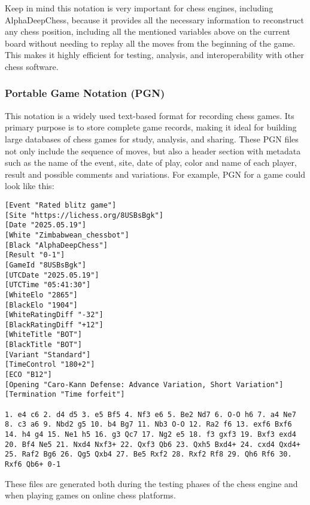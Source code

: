 \noindent Keep in mind this notation is very important for chess engines, including AlphaDeepChess, because it provides all the necessary information to reconstruct any chess position, including all the mentioned variables above on the current board without needing to replay all the moves from the beginning of the game. This makes it highly efficient for testing, analysis, and interoperability with other chess software.

\subsubsection{Portable Game Notation (PGN)}

This notation is a widely used text-based format for recording chess games. Its primary purpose is to store complete game records, making it ideal for building large databases of chess games for study, analysis, and sharing. These PGN files not only include the sequence of moves, but also a header section with metadata such as the name of the event, site, date of play, color and name of each player, result and possible comments and variations. For example, PGN for a game could look like this:

\vspace{1em}

\begin{lstlisting}[basicstyle=\ttfamily\small, captionpos=b, breaklines=true, frame=single, caption={Example of a PGN file}, label={lst:pgn-example}]
[Event "Rated blitz game"]
[Site "https://lichess.org/8USBsBgk"]
[Date "2025.05.19"]
[White "Zimbabwean_chessbot"]
[Black "AlphaDeepChess"]
[Result "0-1"]
[GameId "8USBsBgk"]
[UTCDate "2025.05.19"]
[UTCTime "05:41:30"]
[WhiteElo "2865"]
[BlackElo "1904"]
[WhiteRatingDiff "-32"]
[BlackRatingDiff "+12"]
[WhiteTitle "BOT"]
[BlackTitle "BOT"]
[Variant "Standard"]
[TimeControl "180+2"]
[ECO "B12"]
[Opening "Caro-Kann Defense: Advance Variation, Short Variation"]
[Termination "Time forfeit"]

1. e4 c6 2. d4 d5 3. e5 Bf5 4. Nf3 e6 5. Be2 Nd7 6. O-O h6 7. a4 Ne7 8. c3 a6 9. Nbd2 g5 10. b4 Bg7 11. Nb3 O-O 12. Ra2 f6 13. exf6 Bxf6 14. h4 g4 15. Ne1 h5 16. g3 Qc7 17. Ng2 e5 18. f3 gxf3 19. Bxf3 exd4 20. Bf4 Ne5 21. Nxd4 Nxf3+ 22. Qxf3 Qb6 23. Qxh5 Bxd4+ 24. cxd4 Qxd4+ 25. Raf2 Bg6 26. Qg5 Qxb4 27. Be5 Rxf2 28. Rxf2 Rf8 29. Qh6 Rf6 30. Rxf6 Qb6+ 0-1
\end{lstlisting}

These files are generated both during the testing phases of the chess engine and when playing games on online chess platforms.
